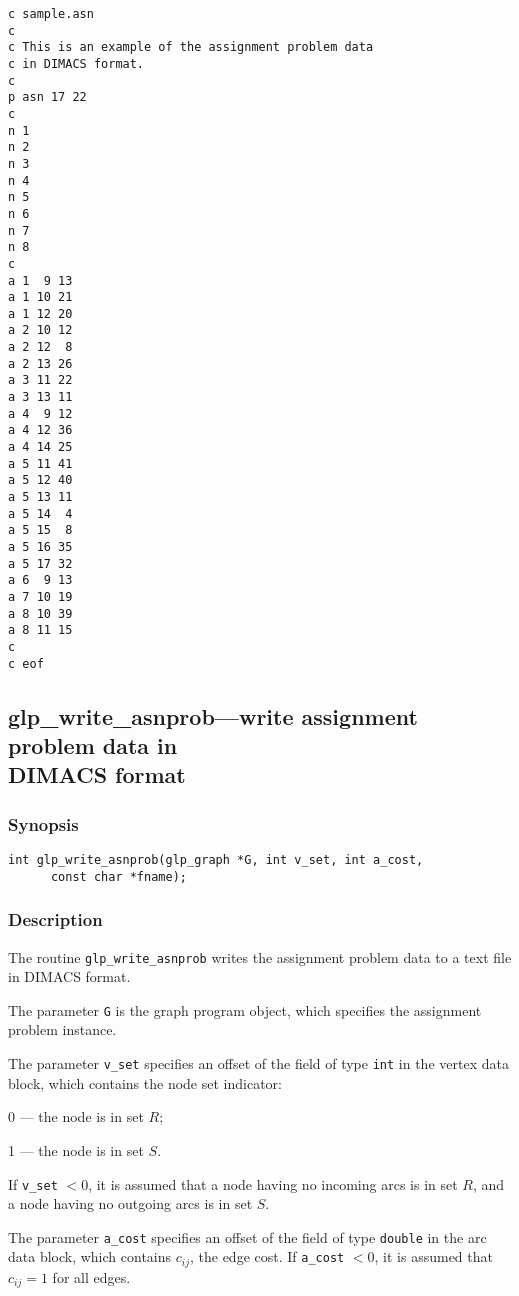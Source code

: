 \newpage

\begin{footnotesize}
\begin{verbatim}
c sample.asn
c
c This is an example of the assignment problem data
c in DIMACS format.
c
p asn 17 22
c
n 1
n 2
n 3
n 4
n 5
n 6
n 7
n 8
c
a 1  9 13
a 1 10 21
a 1 12 20
a 2 10 12
a 2 12  8
a 2 13 26
a 3 11 22
a 3 13 11
a 4  9 12
a 4 12 36
a 4 14 25
a 5 11 41
a 5 12 40
a 5 13 11
a 5 14  4
a 5 15  8
a 5 16 35
a 5 17 32
a 6  9 13
a 7 10 19
a 8 10 39
a 8 11 15
c
c eof
\end{verbatim}
\end{footnotesize}

\newpage

\subsection{glp\_write\_asnprob---write assignment problem data in\\
DIMACS format}

\subsubsection*{Synopsis}

\begin{verbatim}
int glp_write_asnprob(glp_graph *G, int v_set, int a_cost,
      const char *fname);
\end{verbatim}

\subsubsection*{Description}

The routine \verb|glp_write_asnprob| writes the assignment problem data
to a text file in DIMACS format.

The parameter \verb|G| is the graph program object, which specifies the
assignment problem instance.

The parameter \verb|v_set| specifies an offset of the field of type
\verb|int| in the vertex data block, which contains the node set
indicator:

0 --- the node is in set $R$;

1 --- the node is in set $S$.

\noindent
If \verb|v_set| $<0$, it is assumed that a node having no incoming arcs
is in set $R$, and a node having no outgoing arcs is in set $S$.

The parameter \verb|a_cost| specifies an offset of the field of type
\verb|double| in the arc data block, which contains $c_{ij}$, the edge
cost. If \verb|a_cost| $<0$, it is assumed that $c_{ij}=1$ for all
edges.

